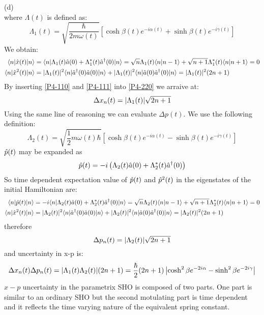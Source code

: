 \begin{homeworkProblem}
\begin{homeworkSection}{(d)}
\begin{equation}
\end{equation}
where $\Lambda(t)$ is defined as:
\begin{equation*}
\Lambda_1(t)=\sqrt{\frac{\hbar}{2m\omega(t)}}\left[\cosh\beta(t) e^{-i\alpha(t)}+\sinh\beta(t) e^{-i\gamma(t)}\right]
\end{equation*}
We obtain:
\begin{align}
\langle n|\Hat{x}(t)|n\rangle&=\langle n|\Lambda_1(t)\Hat{a}(0)+\Lambda_1^*(t)\Hat{a}^\dagger(0)|n\rangle=\sqrt{n}\Lambda_1(t)\langle n|n-1\rangle+\sqrt{n+1}\Lambda_1^*(t)\langle n|n+1\rangle=0\label{P4-110}\\
\langle n|\Hat{x}^2(t)|n\rangle&=\lvert\Lambda_1(t)\rvert^2\langle n|\Hat{a}^\dagger(0)\Hat{a}(0)|n\rangle+\lvert\Lambda_1(t)\rvert^2\langle n|\Hat{a}(0)\Hat{a}^\dagger(0)|n\rangle=\lvert\Lambda_1(t)\rvert^2(2n+1)\label{P4-111}
\end{align}
By inserting \eqref{P4-110} and \eqref{P4-111} into \eqref{P4-220} we arraive at:
\begin{equation}
\Delta x_n(t)=\lvert\Lambda_1(t)\rvert\sqrt{2n+1}
\end{equation}
Using the same line of reasoning we can evaluate $\Delta p(t)$. We use the following definition:
\begin{equation*}
\Lambda_2(t)=\sqrt{\frac{1}{2}m\omega(t)\hbar}\left[\cosh\beta(t) e^{-i\alpha(t)}-\sinh\beta(t) e^{-i\gamma(t)}\right]
\end{equation*}
$\Hat{p}(t)$ may be expanded as 
\begin{equation}
\Hat{p}(t)=-i\left(\Lambda_2(t)\Hat{a}(0)+\Lambda_2^*(t)\Hat{a}^\dagger(0)\right)
\end{equation}
So time dependent expectation value of $\Hat{p}(t)$ and $\Hat{p}^2(t)$ in the eigenstates of the initial Hamiltonian are:
 \begin{align}
 \langle n|\Hat{p}(t)|n\rangle&=-i\langle n|\Lambda_2(t)\Hat{a}(0)+\Lambda_2^*(t)\Hat{a}^\dagger(0)|n\rangle=\sqrt{n}\Lambda_2(t)\langle n|n-1\rangle+\sqrt{n+1}\Lambda_2^*(t)\langle n|n+1\rangle=0\label{P4-440}\\
\langle n|\Hat{x}^2(t)|n\rangle&=\lvert\Lambda_2(t)\rvert^2\langle n|\Hat{a}^\dagger(0)\Hat{a}(0)|n\rangle+\lvert\Lambda_2(t)\rvert^2\langle n|\Hat{a}(0)\Hat{a}^\dagger(0)|n\rangle=\lvert\Lambda_2(t)\rvert^2(2n+1)\label{P4-441}
 \end{align}
 therefore
 \begin{equation}
 \Delta p_n(t)=\lvert\Lambda_2(t)\rvert\sqrt{2n+1}
 \end{equation}
 and uncertainty in x-p is:
 \begin{equation}
 \Delta x_n(t)\Delta p_n(t)=\lvert\Lambda_1(t)\Lambda_2(t)\rvert(2n+1)=\frac{\hbar}{2}(2n+1)\left|\cosh^2\beta e^{-2i\alpha}-\sinh^2\beta e^{-2i\gamma}\right|
 \end{equation}
 $x-p$ uncertainty in the parametrix SHO is composed of two parts. One part is similar to an ordinary SHO but the second motulating part is time dependent and it reflects the time varying nature of  the equivalent spring constant.    
\end{homeworkSection}


\end{homeworkProblem}